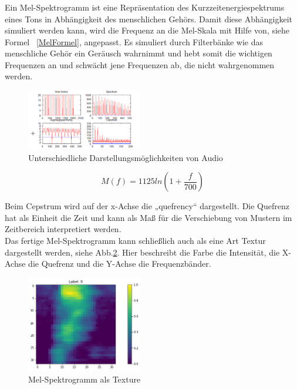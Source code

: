 \documentclass[sigconf]{acmart}
\begin{document}
\subsubsection{}
Ein Mel-Spektrogramm ist eine Repräsentation des Kurzzeitenergiespektrums eines Tons in Abhängigkeit des menschlichen Gehörs. Damit diese Abhängigkeit simuliert werden kann, wird die Frequenz an die Mel-Skala\cite{ganchev2005comparative} mit Hilfe von, siehe Formel ~\ref{MelFormel}, angepasst. Es simuliert durch Filterbänke wie das menschliche Gehör ein Geräusch wahrnimmt und hebt somit die wichtigen Frequenzen an und schwächt jene Frequenzen ab, die nicht wahrgenommen werden. 
\begin{figure}[ht]
  \includegraphics[width=0.45\textwidth]{images/melexplanation}
  \caption{Unterschiedliche Darstellungsmöglichkeiten von Audio}
  \Description{}
  \label{fig:TrainingsDaten}
\end{figure}

\newpage
\begin{equation}\label{MelFormel}
M(f)=1125ln(1+\frac{f}{700})
\end{equation}

\noindent Beim Cepstrum wird auf der x-Achse die „quefrency“ dargestellt. Die Quefrenz hat als Einheit die Zeit und kann als Maß für die Verschiebung von Mustern im Zeitbereich interpretiert werden.\\
\noindent Das fertige Mel-Spektrogramm kann schließlich auch als eine Art Textur dargestellt werden, siehe Abb.\ref{fig:MelTextur}.  
Hier beschreibt die Farbe die Intensität, die X-Achse die Quefrenz und die Y-Achse die Frequenzbänder. 
\begin{figure}[ht]
  \includegraphics[width=0.45\textwidth]{images/Mel}
  \caption{Mel-Spektrogramm als Texture}
  \Description{}
  \label{fig:MelTextur}
\end{figure}
\end{document}
